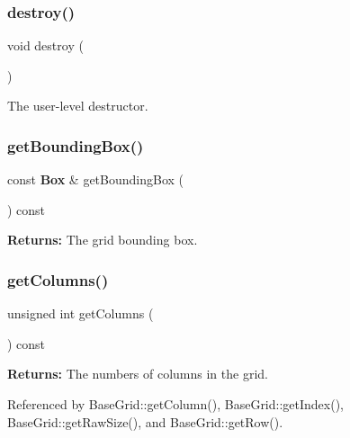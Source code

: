 \subsubsection{\texorpdfstring{destroy()}{destroy()}}
{\footnotesize\ttfamily void destroy (\begin{DoxyParamCaption}{ }\end{DoxyParamCaption})\hspace{0.3cm}{\ttfamily [inline]}}

The user-\/level destructor. \mbox{\label{classKatabatic_1_1BaseGrid_a4b6cf5a28d88d7ad3e6ddeac28a35a0b}} 
\subsubsection{\texorpdfstring{get\+Bounding\+Box()}{getBoundingBox()}}
{\footnotesize\ttfamily const \textbf{ Box} \& get\+Bounding\+Box (\begin{DoxyParamCaption}{ }\end{DoxyParamCaption}) const\hspace{0.3cm}{\ttfamily [inline]}}

{\bfseries Returns\+:} The grid bounding box. \mbox{\label{classKatabatic_1_1BaseGrid_aeaf0dae788f4c997e6172f9c734e3a91}} 
\subsubsection{\texorpdfstring{get\+Columns()}{getColumns()}}
{\footnotesize\ttfamily unsigned int get\+Columns (\begin{DoxyParamCaption}{ }\end{DoxyParamCaption}) const\hspace{0.3cm}{\ttfamily [inline]}}

{\bfseries Returns\+:} The numbers of columns in the grid. 

Referenced by Base\+Grid\+::get\+Column(), Base\+Grid\+::get\+Index(), Base\+Grid\+::get\+Raw\+Size(), and Base\+Grid\+::get\+Row().

